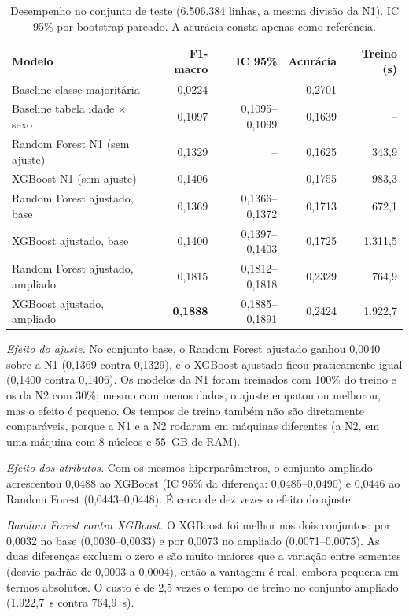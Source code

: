\documentclass[12pt]{article}
\begin{document}
\begin{table}[ht]
\centering
\caption{Desempenho no conjunto de teste (6.506.384 linhas, a mesma divisão da N1). IC 95\% por bootstrap pareado. A acurácia consta apenas como referência.}
\label{tab:comparacao}
\small
\begin{tabular}{|l|r|r|r|r|}
\hline
\textbf{Modelo} & \textbf{F1-macro} & \textbf{IC 95\%} & \textbf{Acurácia} & \textbf{Treino (s)} \\
\hline
Baseline classe majoritária & 0,0224 & -- & 0,2701 & -- \\
Baseline tabela idade $\times$ sexo & 0,1097 & 0,1095--0,1099 & 0,1639 & -- \\
Random Forest N1 (sem ajuste) & 0,1329 & -- & 0,1625 & 343,9 \\
XGBoost N1 (sem ajuste) & 0,1406 & -- & 0,1755 & 983,3 \\
\hline
Random Forest ajustado, base & 0,1369 & 0,1366--0,1372 & 0,1713 & 672,1 \\
XGBoost ajustado, base & 0,1400 & 0,1397--0,1403 & 0,1725 & 1.311,5 \\
Random Forest ajustado, ampliado & 0,1815 & 0,1812--0,1818 & 0,2329 & 764,9 \\
XGBoost ajustado, ampliado & \textbf{0,1888} & 0,1885--0,1891 & 0,2424 & 1.922,7 \\
\hline
\end{tabular}
\end{table}

\emph{Efeito do ajuste.} No conjunto base, o Random Forest ajustado ganhou 0,0040 sobre a N1 (0,1369 contra 0,1329), e o XGBoost ajustado ficou praticamente igual (0,1400 contra 0,1406). Os modelos da N1 foram treinados com 100\% do treino e os da N2 com 30\%; mesmo com menos dados, o ajuste empatou ou melhorou, mas o efeito é pequeno. Os tempos de treino também não são diretamente comparáveis, porque a N1 e a N2 rodaram em máquinas diferentes (a N2, em uma máquina com 8 núcleos e 55~GB de RAM).

\emph{Efeito dos atributos.} Com os mesmos hiperparâmetros, o conjunto ampliado acrescentou 0,0488 ao XGBoost (IC 95\% da diferença: 0,0485--0,0490) e 0,0446 ao Random Forest (0,0443--0,0448). É cerca de dez vezes o efeito do ajuste.

\emph{Random Forest contra XGBoost.} O XGBoost foi melhor nos dois conjuntos: por 0,0032 no base (0,0030--0,0033) e por 0,0073 no ampliado (0,0071--0,0075). As duas diferenças excluem o zero e são muito maiores que a variação entre sementes (desvio-padrão de 0,0003 a 0,0004), então a vantagem é real, embora pequena em termos absolutos. O custo é de 2,5 vezes o tempo de treino no conjunto ampliado (1.922,7~s contra 764,9~s).
\end{document}
